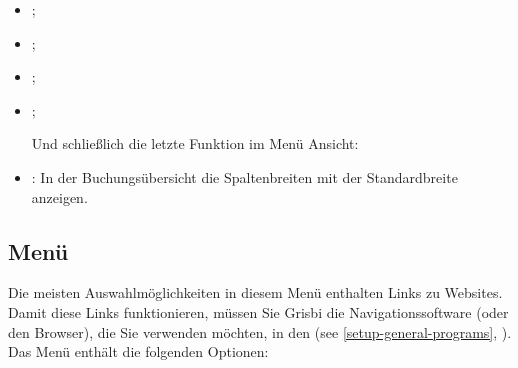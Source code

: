 \begin{itemize}
	\item {};%
	\item {};%
	\item {};%
	\item {};%
	\vspace{2mm}
	\begin{addmargin*}[-10pt]{0cm} 	%
	Und schließlich die letzte Funktion im Menü Ansicht:
	\end{addmargin*}	
	\item {}: In der Buchungsübersicht die Spaltenbreiten mit der Standardbreite anzeigen.
\end{itemize}


\subsection{Menü \label{home-menus-help}}

Die meisten Auswahlmöglichkeiten in diesem Menü enthalten Links zu Websites. Damit diese Links funktionieren, müssen Sie Grisbi die Navigationssoftware (oder den Browser), die Sie verwenden möchten, in den  (see \vref{setup-general-programs}, ). Das Menü  enthält die folgenden Optionen:

